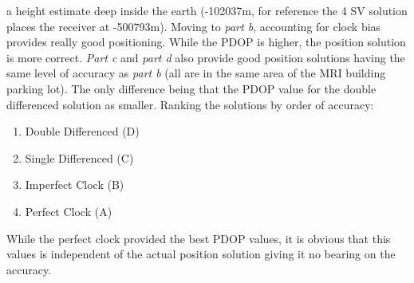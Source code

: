 \documentclass[11pt]{article}
\begin{document}
\begin{enumerate}[label=\textbf{\arabic*.}]
  a height estimate deep inside the earth (-102037m, for reference the 4 SV 
  solution places the receiver at -500793m). Moving to \emph{part b}, accounting 
  for clock bias provides really good positioning. While the PDOP is higher, 
  the position solution is more correct. \emph{Part c} and \emph{part d} also 
  provide good position solutions having the same level of accuracy as \emph{part
  b} (all are in the same area of the MRI building parking lot). The only difference 
  being that the PDOP value for the double differenced solution as smaller. 
  Ranking the solutions by order of accuracy:
  \begin{enumerate}[1.]
    \itemsep -2pt 
    \item Double Differenced (D)
    \item Single Differenced (C)
    \item Imperfect Clock (B)
    \item Perfect Clock (A)
  \end{enumerate}
  While the perfect clock provided the best PDOP values, it is obvious that this 
  values is independent of the actual position solution giving it no bearing on 
  the accuracy.


\end{enumerate}
\end{document}
